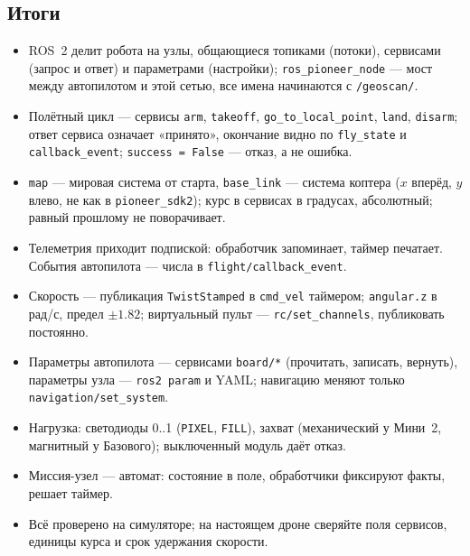 \subsection*{Итоги}
\begin{itemize}
    \item ROS~2 делит робота на узлы, общающиеся топиками (потоки), сервисами (запрос и ответ) и параметрами (настройки); \texttt{ros\_pioneer\_node} --- мост между автопилотом и этой сетью, все имена начинаются с \texttt{/geoscan/}.
    \item Полётный цикл --- сервисы \texttt{arm}, \texttt{takeoff}, \texttt{go\_to\_local\_point}, \texttt{land}, \texttt{disarm}; ответ сервиса означает «принято», окончание видно по \texttt{fly\_state} и \texttt{callback\_event}; \verb|success = False| --- отказ, а не ошибка.
    \item \texttt{map} --- мировая система от старта, \texttt{base\_link} --- система коптера ($x$ вперёд, $y$ влево, не как в \texttt{pioneer\_sdk2}); курс в сервисах в градусах, абсолютный; равный прошлому не поворачивает.
    \item Телеметрия приходит подпиской: обработчик запоминает, таймер печатает. События автопилота --- числа в \texttt{flight/callback\_event}.
    \item Скорость --- публикация \texttt{TwistStamped} в \texttt{cmd\_vel} таймером; \texttt{angular.z} в рад/с, предел $\pm 1.82$; виртуальный пульт --- \texttt{rc/set\_channels}, публиковать постоянно.
    \item Параметры автопилота --- сервисами \texttt{board/*} (прочитать, записать, вернуть), параметры узла --- \texttt{ros2 param} и YAML; навигацию меняют только \texttt{navigation/set\_system}.
    \item Нагрузка: светодиоды 0..1 (\texttt{PIXEL}, \texttt{FILL}), захват (механический у Мини~2, магнитный у Базового); выключенный модуль даёт отказ.
    \item Миссия-узел --- автомат: состояние в поле, обработчики фиксируют факты, решает таймер.
    \item Всё проверено на симуляторе; на настоящем дроне сверяйте поля сервисов, единицы курса и срок удержания скорости.
\end{itemize}
